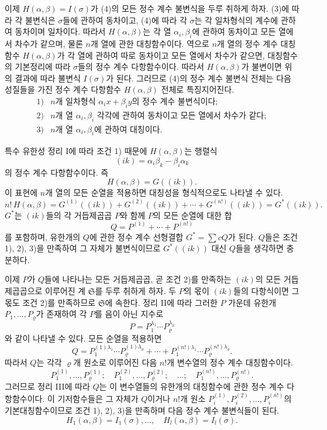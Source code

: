 이제 \(H(\alpha,\beta)=I(\sigma)\)가 (4)의 모든 정수 계수 불변식을 두루 취하게 하자. (3)에 따라 각 불변식은 \(\sigma\)들에 관하여 동차이고, (4)에 따라 각 \(\sigma\)는 각 일차형식의 계수에 관하여 동차이며 일차이다. 따라서 \(H(\alpha,\beta)\)는 각 열 \(\alpha_i,\beta_i\)에 관하여 동차이고 모든 열에서 차수가 같으며, 물론 \(n\)개 열에 관한 대칭함수이다. 역으로 \(n\)개 열의 정수 계수 대칭함수 \(H(\alpha,\beta)\)가 각 열에 관하여 따로 동차이고 모든 열에서 차수가 같으면, 대칭함수의 기본정리에 따라 \(\sigma\)들의 정수 계수 다항함수이다. 따라서 \(H(\alpha,\beta)\)가 불변이면 위의 결과에 따라 불변식 \(I(\sigma)\)가 된다. 그러므로 (4)의 정수 계수 불변식 전체는 다음 성질들을 가진 정수 계수 다항함수 \(H(\alpha,\beta)\) 전체로 특징지어진다.
\[
\begin{array}{ll}
1)& n\text{개 일차형식 }\alpha_i x+\beta_i y\text{의 정수 계수 불변식이다};\\
2)& n\text{개 열 }\alpha_i,\beta_i\text{ 각각에 관하여 동차이고 모든 열에서 차수가 같다};\\
3)& n\text{개 열 }\alpha_i,\beta_i\text{에 관하여 대칭이다}.
\end{array}
\]

특수 유한성 정리 I에 따라 조건 1) 때문에 \(H(\alpha,\beta)\)는 행렬식
\[
(ik)=\alpha_i\beta_k-\beta_i\alpha_k
\]
의 정수 계수 다항함수이다. 즉
\[
H(\alpha,\beta)=G((ik)).
\]
이 표현에 \(n\)개 열의 모든 순열을 적용하면 대칭성을 형식적으로도 나타낼 수 있다.
\begin{equation}
\tag{10}
n!\,H(\alpha,\beta)
=G^{(1)}((ik))+G^{(2)}((ik))+\cdots+G^{(n!)}((ik))
=G^*((ik)).
\end{equation}
\(G^*\)는 \((ik)\)들의 각 거듭제곱곱 \(P\)와 함께 \(P\)의 모든 순열에 대한 합
\[
Q=P^{(1)}+\cdots+P^{(n!)}
\]
를 포함하며, 유한개의 \(Q\)에 관한 정수 계수 선형결합 \(G^*=\sum cQ\)가 된다. \(Q\)들은 조건 1), 2), 3)을 만족하여 그 자체가 불변식이므로 \(G^*((ik))\) 대신 \(Q\)들을 생각하면 충분하다.

이제 \(P\)가 \(Q\)들에 나타나는 모든 거듭제곱곱, 곧 조건 2)를 만족하는 \((ik)\)의 모든 거듭제곱곱으로 이루어진 계 \(\mathfrak S\)를 두루 취하게 하자. 두 \(P\)의 몫이 \((ik)\)들의 다항식이면 그 몫도 조건 2)를 만족하므로 \(\mathfrak S\)에 속한다. 정리 II에 따라 그러한 \(P\) 가운데 유한개 \(P_1,\ldots,P_\varrho\)가 존재하여 각 \(P\)를 음이 아닌 지수로
\[
P=P_1^{\lambda_1}\cdots P_\varrho^{\lambda_\varrho}
\]
와 같이 나타낼 수 있다. 모든 순열을 적용하면
\[
Q=
P_1^{(1)\lambda_1}\cdots P_\varrho^{(1)\lambda_\varrho}
+\cdots+
P_1^{(n!)\lambda_1}\cdots P_\varrho^{(n!)\lambda_\varrho}.
\]
따라서 \(Q\)는 각각 \(\varrho\)개 원소로 이루어진 다음 \(n!\)개 변수열의 정수 계수 대칭함수이다.
\[
P_1^{(1)},\ldots,P_\varrho^{(1)};\quad
P_1^{(2)},\ldots,P_\varrho^{(2)};\quad\ldots;\quad
P_1^{(n!)},\ldots,P_\varrho^{(n!)}.
\]
그러므로 정리 III에 따라 \(Q\)는 이 변수열들의 유한개의 대칭함수에 관한 정수 계수 다항함수이다. 이 기저함수들은 그 자체가 \(Q\)이거나 \(n!\)개 원소 \(P_i^{(1)},P_i^{(2)},\ldots,P_i^{(n!)}\)의 기본대칭함수이므로 조건 1), 2), 3)을 만족하며 다음 정수 계수 불변식들이 된다.
\begin{equation}
\tag{11}
H_1(\alpha,\beta)=I_1(\sigma),\ldots,\quad
H_l(\alpha,\beta)=I_l(\sigma).
\end{equation}

